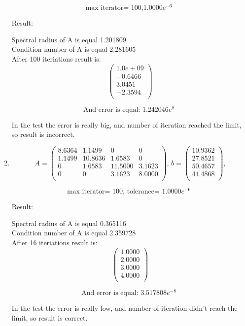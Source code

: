 \documentclass[12pt]{article}
\begin{document}
\begin{enumerate}
\[
\textrm{ max iterator= 100,$1.0000e^{-6}$  }
\]

Result:

Spectral radius of A is equal 1.201809 \\
Condition number of A is equal 2.281605 \\
After 100 iteriations result is:
\[
\begin{pmatrix}
  1.0e+09\\
   -0.6466\\
    3.0451\\
   -2.3594\\
\end{pmatrix}
\]

\[
\textrm{ And error is equal: $1.242046e^{8}$ }
\]

In the test the error is really big, and number of iteration reached the limit, so result is incorrect.

\item

\[
A= \begin{pmatrix}
    8.6364  &  1.1499    &     0  &       0\\
    1.1499   &10.8636 &   1.6583 &        0\\
         0    &1.6583 &  11.5000   & 3.1623\\
         0      &   0  &  3.1623   & 8.0000\\
\end{pmatrix}\textbf{, }
b= \begin{pmatrix}
   10.9362\\
   27.8521\\
   50.4657\\
   41.4868\\
\end{pmatrix}\textbf{,}
\]

\[
\textrm{ max iterator= 100, tolerance= $1.0000e^{-6}$  }
\]

Result:

Spectral radius of A is equal 0.365116 \\
Condition number of A is equal 2.359728 \\
After 16 iteriations result is:\\
\[
\begin{pmatrix}
    1.0000\\
    2.0000\\
    3.0000\\
    4.0000\\
\end{pmatrix}
\]

\[
\textrm{ And error is equal: $3.517808e^{-8}$ }
\]

In the test the error is really low, and number of iteration didn't reach the limit, so result is correct.

\end{enumerate}
\end{document}
